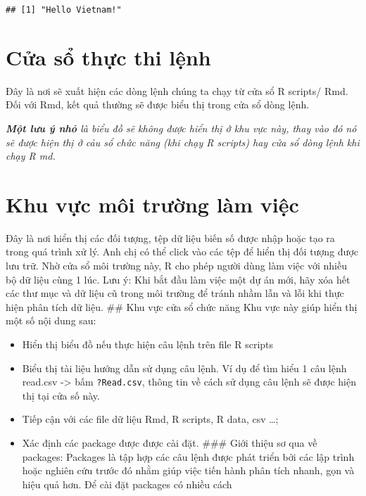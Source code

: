\documentclass[
]{book}
\providecommand{\tightlist}{%
  \setlength{\itemsep}{0pt}\setlength{\parskip}{0pt}}
\theoremstyle{definition}
\theoremstyle{definition}
\theoremstyle{definition}
\theoremstyle{definition}
\theoremstyle{remark}
\begin{document}
\begin{verbatim}
## [1] "Hello Vietnam!"
\end{verbatim}

\hypertarget{cux1eeda-sux1ed5-thux1ef1c-thi-lux1ec7nh}{%
\section{Cửa sổ thực thi lệnh}\label{cux1eeda-sux1ed5-thux1ef1c-thi-lux1ec7nh}}

Đây là nơi sẽ xuất hiện các dòng lệnh chúng ta chạy từ cửa sổ R scripts/ Rmd. Đối với Rmd, kết quả thường sẽ được biểu thị trong cửa sổ dòng lệnh.

\emph{\textbf{Một lưu ý nhỏ} là biểu đồ sẽ không được hiển thị ở khu vực này, thay vào đó nó sẽ được hiện thị ở cảu sổ chức năng (khi chạy R scripts) hay cửa sổ dòng lệnh khi chạy R md.}

\hypertarget{khu-vux1ef1c-muxf4i-trux1b0ux1eddng-luxe0m-viux1ec7c}{%
\section{Khu vực môi trường làm việc}\label{khu-vux1ef1c-muxf4i-trux1b0ux1eddng-luxe0m-viux1ec7c}}

Đây là nơi hiển thị các đối tượng, tệp dữ liệu biến số được nhập hoặc tạo ra trong quá trình xử lý. Anh chị có thể click vào các tệp để hiển thị đối tượng được lưu trữ. Nhờ cửa sổ môi trường này, R cho phép người dùng làm việc với nhiều bộ dữ liệu cùng 1 lúc. Lưu ý: Khi bắt đầu làm việc một dự án mới, hãy xóa hết các thư mục và dữ liệu cũ trong môi trường để tránh nhầm lẫn và lỗi khi thực hiện phân tích dữ liệu. \#\# Khu vực cửa sổ chức năng Khu vực này giúp hiển thị một số nội dung sau:

\begin{itemize}
\tightlist
\item
  Hiển thị biểu đồ nếu thực hiện câu lệnh trên file R scripts
\item
  Biểu thị tài liệu hướng dẫn sử dụng câu lệnh. Ví dụ để tìm hiểu 1 câu lệnh read.csv -\textgreater{} bấm \texttt{?Read.csv}, thông tin về cách sử dụng câu lệnh sẽ được hiện thị tại cửa số này.
\item
  Tiếp cận với các file dữ liệu Rmd, R scripts, R data, csv \ldots;
\item
  Xác định các package được được cài đặt. \#\#\# Giới thiệu sơ qua về packages: Packages là tập hợp các câu lệnh được phát triển bởi các lập trình hoặc nghiên cứu trước đó nhằm giúp việc tiến hành phân tích nhanh, gọn và hiệu quả hơn. Để cài đặt packages có nhiều cách
\end{itemize}
\end{document}
